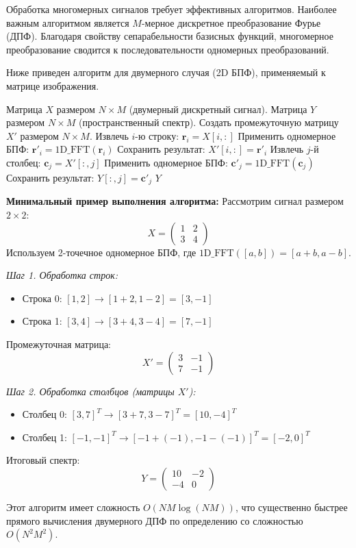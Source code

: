 \documentclass[12pt,a4paper]{article}
\begin{document}
Обработка многомерных сигналов требует эффективных алгоритмов. Наиболее важным алгоритмом является $M$-мерное дискретное преобразование Фурье (ДПФ). Благодаря свойству сепарабельности базисных функций, многомерное преобразование сводится к последовательности одномерных преобразований.

Ниже приведен алгоритм для двумерного случая (2D БПФ), применяемый к матрице изображения.

\begin{algorithm}[H]
\caption{Алгоритм 2D БПФ (Row-Column Decomposition)}
\begin{algorithmic}[1]
\Require Матрица $X$ размером $N \times M$ (двумерный дискретный сигнал).
\Ensure Матрица $Y$ размером $N \times M$ (пространственный спектр).
\State Создать промежуточную матрицу $X'$ размером $N \times M$.
 
    \State Извлечь $i$-ю строку: $\mathbf{r}_i = X[i, :]$
    \State Применить одномерное БПФ: $\mathbf{r}'_i = \text{1D\_FFT}(\mathbf{r}_i)$
    \State Сохранить результат: $X'[i, :] = \mathbf{r}'_i$
\EndFor
{} 
    \State Извлечь $j$-й столбец: $\mathbf{c}_j = X'[:, j]$
    \State Применить одномерное БПФ: $\mathbf{c}'_j = \text{1D\_FFT}(\mathbf{c}_j)$
    \State Сохранить результат: $Y[:, j] = \mathbf{c}'_j$
\EndFor
\State \Return $Y$
\end{algorithmic}
\end{algorithm}

\textbf{Минимальный пример выполнения алгоритма:}
Рассмотрим сигнал размером $2 \times 2$:
$$ X = \begin{pmatrix} 1 & 2 \\ 3 & 4 \end{pmatrix} $$
Используем 2-точечное одномерное БПФ, где $\text{1D\_FFT}([a, b]) = [a+b, a-b]$.

\textit{Шаг 1. Обработка строк:}
\begin{itemize}
    \item Строка 0: $[1, 2] \rightarrow [1+2, 1-2] = [3, -1]$
    \item Строка 1: $[3, 4] \rightarrow [3+4, 3-4] = [7, -1]$
\end{itemize}
Промежуточная матрица:
$$ X' = \begin{pmatrix} 3 & -1 \\ 7 & -1 \end{pmatrix} $$

\textit{Шаг 2. Обработка столбцов (матрицы $X'$):}
\begin{itemize}
    \item Столбец 0: $[3, 7]^T \rightarrow [3+7, 3-7]^T = [10, -4]^T$
    \item Столбец 1: $[-1, -1]^T \rightarrow [-1+(-1), -1-(-1)]^T = [-2, 0]^T$
\end{itemize}
Итоговый спектр:
$$ Y = \begin{pmatrix} 10 & -2 \\ -4 & 0 \end{pmatrix} $$

Этот алгоритм имеет сложность $O(N M \log(NM))$, что существенно быстрее прямого вычисления двумерного ДПФ по определению со сложностью $O(N^2 M^2)$.
\end{document}

